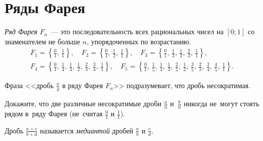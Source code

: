 
\section*{Ряды Фарея}



{\def\thefootnote{$^\circ$}%
}

\emph{Ряд Фарея} $F_n$~---
это последовательность всех рациональных чисел на $[0; 1]$ со знаменателем не
больше $n$, упорядоченных по возрастанию.
\begin{gather*}
    F_1
=
    \left\{
        \tfrac{0}{1}, \, \tfrac{1}{1}
    \right\}
,\quad
    F_2
=
    \left\{
        \tfrac{0}{1}, \, \tfrac{1}{2}, \, \tfrac{1}{1}
    \right\}
,\quad
    F_3
=
    \left\{
        \tfrac{0}{1}, \, \tfrac{1}{3}, \, \tfrac{1}{2}, \,
        \tfrac{2}{3}, \, \tfrac{1}{1}
    \right\}
,\\
    F_4
=
    \left\{
        \tfrac{0}{1}, \, \tfrac{1}{4}, \, \tfrac{1}{3}, \,
        \tfrac{1}{2}, \, \tfrac{2}{3}, \, \tfrac{3}{4}, \,
        \tfrac{1}{1}
    \right\}
,\quad
    F_5
=
    \left\{
        \tfrac{0}{1}, \, \tfrac{1}{5}, \, \tfrac{1}{4}, \,
        \tfrac{1}{3}, \, \tfrac{2}{5}, \, \tfrac{1}{2}, \,
        \tfrac{3}{5}, \, \tfrac{2}{3}, \, \tfrac{3}{4}, \,
        \tfrac{4}{5}, \, \tfrac{1}{1}
    \right\}
.\end{gather*}

\observation
Фраза <<дробь $\frac{x}{y}$ в ряду Фарея $F_n$>> подразумевает, что дробь
несократимая.

\begin{problems}

\itemx{$^\circ$}
Докажите, что две различные несократимые дроби $\tfrac{a}{n}$ и~$\tfrac{b}{n}$
никогда не~могут стоять рядом в~ряду Фарея
(не~считая $\tfrac{0}{1}$ и $\tfrac{1}{1}$).

\end{problems}

Дробь $\frac{a + c}{b + d}$ называется \emph{медиантой}
дробей $\frac{a}{b}$ и $\frac{c}{d}$.

